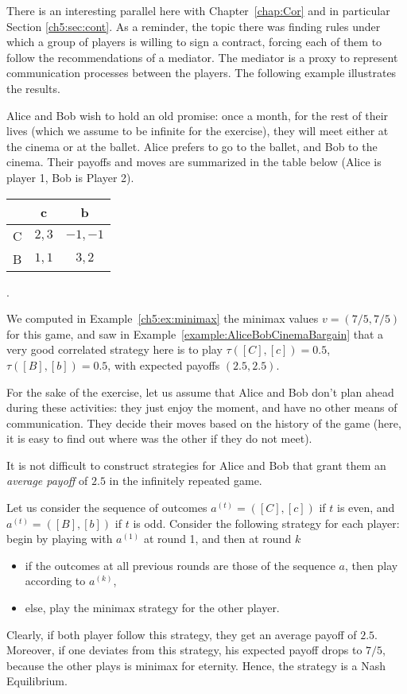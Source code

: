 There is an interesting parallel here with Chapter~\ref{chap:Cor} and in
particular Section \ref{ch5:sec:cont}.
As a reminder, the topic there was finding rules under which a group of
players is willing to sign a contract, forcing each of them to follow the
recommendations of a mediator. The mediator is a proxy to represent
communication processes between the players. The following example
illustrates the results.

\begin{example}
Alice and Bob wish to hold an old promise: once a month, for the rest of
their lives (which we assume to be infinite for the exercise), they will
meet either at the cinema or at the ballet.
Alice prefers to go to the ballet, and Bob to the cinema.
Their payoffs and moves are summarized in the table below (Alice is player
1, Bob is Player 2).

\begin{center}
    \begin{tabular}{c | c  c}
          & c & b \\
        \hline
        C & $2, 3$ & $-1, -1$ \\
        B & $1, 1$ & $3, 2$
    \end{tabular}.
\end{center}
We computed in Example~\ref{ch5:ex:minimax} the minimax values
$v = (7/5, 7/5)$ for this game, and saw in
Example~\ref{example:AliceBobCinemaBargain} that a very good correlated
strategy here is to play $\tau([C],[c]) = 0.5$, $\tau([B],[b]) = 0.5$,
with expected payoffs $(2.5,2.5)$.

For the sake of the exercise, let us assume that Alice and Bob don't plan
ahead during these activities: they just enjoy the moment, and have no
other means of communication.
They decide their moves based on the history of the game (here, it is easy
to find out where was the other if they do not meet).

It is not difficult to construct strategies for Alice and Bob that grant
them an \emph{average payoff} of $2.5$ in the infinitely repeated game.

Let us consider the sequence of outcomes $a^{(t)} = ([C],[c])$ if $t$ is
even, and $a^{(t)} = ([B],[b])$ if $t$ is odd.
Consider the following strategy for each player: begin by playing with
$a^{(1)}$ at round 1, and then at round $k$
\begin{itemize}
    \item if the outcomes at all previous rounds are those of the
    sequence $a$, then play according to $a^{(k)}$,
    \item else, play the minimax strategy for the other player.
\end{itemize}
Clearly, if both player follow this strategy, they get an average payoff
of $2.5$. Moreover, if one deviates from this strategy, his expected
payoff drops to $7/5$, because the other plays is minimax for eternity.
Hence, the strategy is a Nash Equilibrium.
\end{example}





